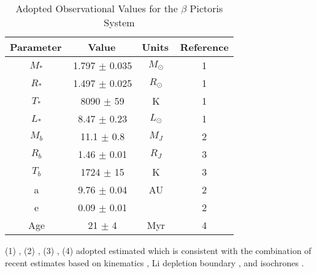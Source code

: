 \begin{table}
\centering
\begin{threeparttable}
\caption[Adopted Observational Values for the $\beta$ Pictoris System]{Adopted Observational Values for the $\beta$ Pictoris System}
\vspace{0.05in}
\label{bpicparams}
\begin{tabular}{|c |c |c| c|} %
\hline
Parameter\,&Value\,&Units\,&Reference\\
\hline
$M_*$       & 1.797 $\pm$ 0.035     & $M_\odot$ & 1\\
$R_*$       & 1.497 $\pm$ 0.025     & $R_\odot$ & 1\\
$T_*$       & 8090 $\pm$ 59         & K         & 1\\
$L_*$       & 8.47 $\pm$ 0.23     & $L_{\odot}$ & 1\\
$M_b$       & 11.1 $\pm$ 0.8      & $M_J$     & 2\\
$R_b$       & 1.46 $\pm$ 0.01     & $R_J$     & 3\\
$T_b$       & 1724 $\pm$ 15       & K         & 3\\
  a           & 9.76 $\pm$ 0.04 & AU       & 2 \\
  e          &   0.09 $\pm$ 0.01   &       & 2 \\
Age & 21 $\pm$ 4 & Myr & 4\\
\hline
\end{tabular}
\begin{tablenotes}
\small
\item (1) \citet{Zwintz19},
(2) \citet{Lagrange20},
(3) \citet{Chilcote17},
(4) adopted estimated which is consistent with the
combination of recent estimates based on 
kinematics \citep{Crundall19,Miret-Roig20}, Li depletion boundary \citep{Binks16,Shkolnik17}, and isochrones
\citep{Mamajek14,Bell15}. 
\end{tablenotes}
\end{threeparttable}
\end{table}
